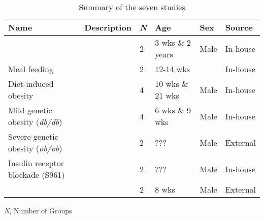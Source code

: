 \begin{table}[h]
\renewcommand{\arraystretch}{2}
  \centering
  \caption{Summary of the seven studies}
  \label{tab:app_chp3_study}

  \begin{tabularx}{\textwidth}{W{2.5cm} X W{1cm} W{1.7cm} W{1.5cm} W{1.3cm}}
    \toprule
    \textbf{Name} & \textbf{Description} & \textbf{\textit{N}} & \textbf{Age} & \textbf{Sex} & \textbf{Source} \\
    \midrule
     &  & 2 & 3 wks \& 2 years & Male & In-house \\
    \hline
    Meal feeding &  & 2 & 12-14 wks &  & In-house \\
    \hline
    Diet-induced obesity &  & 4 & 10 wks \& 21 wks & Male & In-house \\
    \hline
    Mild genetic obesity (\textit{db/db}) &  & 4 & 6 wks \& 9 wks & Male & In-house \\
    \hline
    Severe genetic obesity (\textit{ob/ob}) &  & 2 & ??? & Male & External \textbf{\cite{chung_endocrine-exocrine_2020}} \\
    \hline
    Insulin receptor blockade (S961) &  & 2 & ??? & Male & In-house \\
    \hline
     &  & 2 & 8 wks & Male & External \textbf{\cite{sachs_targeted_2020}} \\
    \bottomrule
   
  \end{tabularx}
\end{table}
\textit{N}, Number of Groups

\clearpage

